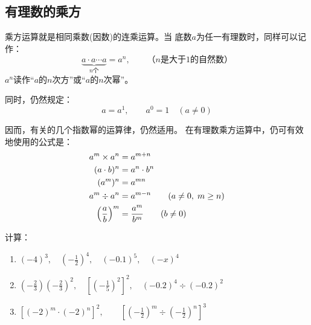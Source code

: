 \subsection{有理数的乘方}
  乘方运算就是相同乘数(因数)的连乘运算。当
底数$a$为任一有理数时，同样可以记作：
\[\underbrace{a\cdot a\cdots a}_{n\text{个}} =a^n,\qquad \text{（$n$是大于1的自然数）}  \]
$a^n$读作“$a$的$n$次方”或“$a$的$n$次幂”。

同时，仍然规定：
\[a=a^1,\qquad a^0=1\quad (a\ne 0) \]

因而，有关的几个指数幂的运算律，仍然适用。
在有理数乘方运算中，仍可有效地使用的公式是：
\[\begin{split}
    a^m\times a^n &=a^{m+n}\\
    (a\cdot b)^n&=a^n\cdot b^n\\
    (a^m)^n&=a^{mn}\\
    a^m\div a^n&=a^{m-n}\qquad (a\ne 0,\; m\ge n)\\
\left(\dfrac{a}{b}\right)^m&=\dfrac{a^m}{b^m}\qquad (b\ne 0)
\end{split}\]



\begin{example}
    计算：
\begin{enumerate}
    \item $(-4)^3,\quad \left(-\frac{1}{2}\right)^4,\quad (-0.1)^5,\quad (-x)^4$
    \item $\left(-\frac{2}{3}\right)\left(-\frac{2}{3}\right)^2,\quad \left[\left(-\frac{1}{5}\right)^2\right]^2,\quad (-0.2)^4\div (-0.2)^2$
    \item $\left[(-2)^m\cdot (-2)^n\right]^2,\qquad \left[\left(-\frac{1}{2}\right)^m\div \left(-\frac{1}{2}\right)^n\right]^3$
\end{enumerate}
\end{example}

